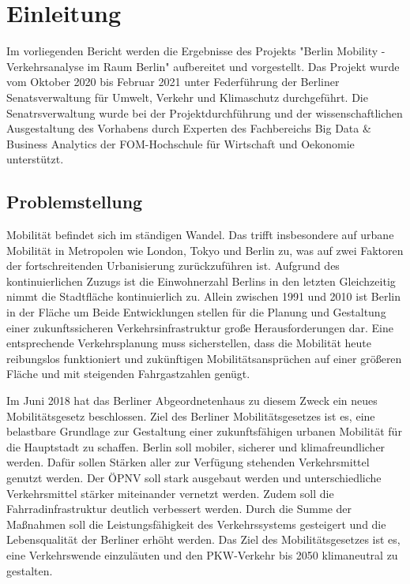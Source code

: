 \section{Einleitung}
Im vorliegenden Bericht werden die Ergebnisse des Projekts "Berlin Mobility - Verkehrsanalyse im Raum Berlin" aufbereitet und vorgestellt. Das Projekt wurde vom Oktober 2020 bis Februar 2021 unter Federführung der Berliner Senatsverwaltung für Umwelt, Verkehr und Klimaschutz durchgeführt. Die Senatrsverwaltung wurde bei der Projektdurchführung und der wissenschaftlichen Ausgestaltung des Vorhabens durch Experten des Fachbereichs Big Data \& Business Analytics der FOM-Hochschule für Wirtschaft und Oekonomie unterstützt.

\subsection{Problemstellung}
Mobilität befindet sich im ständigen Wandel. Das trifft insbesondere auf urbane Mobilität in Metropolen wie London, Tokyo und Berlin zu, was auf zwei Faktoren der fortschreitenden Urbanisierung zurückzuführen ist. Aufgrund des kontinuierlichen Zuzugs ist die Einwohnerzahl Berlins in den letzten  Gleichzeitig nimmt die Stadtfläche kontinuierlich zu. Allein zwischen 1991 und 2010 ist Berlin in der Fläche um   Beide Entwicklungen stellen für die Planung und Gestaltung einer zukunftssicheren Verkehrsinfrastruktur große Herausforderungen dar. Eine entsprechende Verkehrsplanung muss sicherstellen, dass die Mobilität heute reibungslos funktioniert und zukünftigen Mobilitätsansprüchen auf einer größeren Fläche und mit steigenden Fahrgastzahlen genügt.

Im Juni 2018 hat das Berliner Abgeordnetenhaus zu diesem Zweck ein neues Mobilitätsgesetz beschlossen. Ziel des Berliner Mobilitätsgesetzes ist es, eine belastbare Grundlage zur Gestaltung einer zukunftsfähigen urbanen Mobilität für die Hauptstadt zu schaffen. Berlin soll mobiler, sicherer und klimafreundlicher werden. Dafür sollen Stärken aller zur Verfügung stehenden Verkehrsmittel genutzt werden. Der \gls{ÖPNV} soll stark ausgebaut werden und unterschiedliche Verkehrsmittel stärker miteinander vernetzt werden. Zudem soll die Fahrradinfrastruktur deutlich verbessert werden. Durch die Summe der Maßnahmen soll die Leistungsfähigkeit des Verkehrssystems gesteigert und die Lebensqualität der Berliner erhöht werden. Das Ziel des Mobilitätsgesetzes ist es, eine Verkehrswende einzuläuten und den PKW-Verkehr bis 2050 klimaneutral zu gestalten. 

